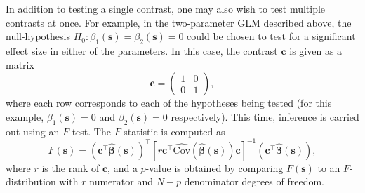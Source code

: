 In addition to testing a single contrast, one may also wish to test multiple contrasts at once. For example, in the two-parameter GLM described above, the null-hypothesis $H_{0} : \beta_{1}(\bm{s}) = \beta_{2}(\bm{s}) = 0$ could be chosen to test for a significant effect size in either of the parameters. In this case, the contrast $\bm{c}$ is given as a matrix
\begin{equation}
\label{eq:f_stat_contrast}
\bm{c} = 
\begin{pmatrix}
1 & 0 \\
0 & 1
\end{pmatrix},
\end{equation}
where each row corresponds to each of the hypotheses being tested (for this example, $\beta_{1}(\bm{s}) = 0$ and $\beta_{2}(\bm{s}) = 0$ respectively). This time, inference is carried out using an $F$-test. The $F$-statistic is computed as 
\begin{equation}
\label{eq:f_statistic}
F(\bm{s}) = (\bm{c}^{\intercal}\bm{\hat{\beta}}(\bm{s}))^{\intercal}[r\bm{c}^{\intercal}\widehat{\mathrm{Cov}}(\hat{\bm{\beta}}(\bm{s}))\bm{c}]^{-1}(\bm{c}^{\intercal}\bm{\hat{\beta}}(\bm{s})),
\end{equation}
where $r$ is the rank of $\bm{c}$, and a $p$-value is obtained by comparing $F(\bm{s})$ to an $F$-distribution with $r$ numerator and $N-p$ denominator degrees of freedom. 

